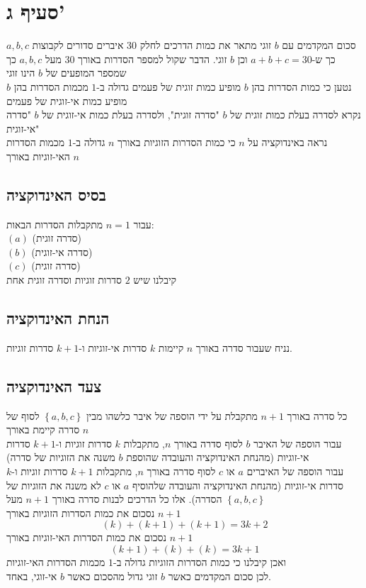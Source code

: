 \documentclass[12pt, titlepage]{article}
\begin{document}
\section*{סעיף ג'}
סכום המקדמים עם $b$ זוגי מתאר את כמות הדרכים לחלק $30$ איברים סדורים לקבוצות $a,b,c$ כך ש-$a+b+c=30$ וכן $b$ זוגי. הדבר שקול למספר הסדרות באורך $30$ מעל $a,b,c$ כך שמספר המופעים של $b$ הינו זוגי\\
נטען כי כמות הסדרות בהן $b$ מופיע כמות זוגית של פעמים גדולה ב-$1$ מכמות הסדרות בהן $b$ מופיע כמות אי-זוגית של פעמים\\
נקרא לסדרה בעלת כמות זוגית של $b$ "סדרה זוגית", ולסדרה בעלת כמות אי-זוגית של $b$ "סדרה אי-זוגית" \\
נראה באינדוקציה על $n$ כי כמות הסדרות הזוגיות באורך $n$ גדולה ב-$1$ מכמות הסדרות האי-זוגיות באורך $n$
\subsection*{בסיס האינדוקציה}
עבור $n=1$ מתקבלות הסדרות הבאות:\\
$\left(a\right)$ (סדרה זוגית) \\
$\left(b\right)$ (סדרה אי-זוגית) \\
$\left(c\right)$ (סדרה זוגית) \\
קיבלנו שיש $2$ סדרות זוגיות וסדרה זוגית אחת
\subsection*{הנחת האינדוקציה}
נניח שעבור סדרה באורך $n$ קיימות $k$ סדרות אי-זוגיות ו-$k+1$ סדרות זוגיות.
\subsection*{צעד האינדוקציה}
כל סדרה באורך $n+1$ מתקבלת על ידי הוספה של איבר כלשהו מבין $\left\{a,b,c\right\}$ לסוף של סדרה קיימת באורך $n$\\
עבור הוספה של האיבר $b$ לסוף סדרה באורך $n$, מתקבלות $k$ סדרות זוגיות ו-$k+1$ סדרות אי-זוגיות (מהנחת האינדוקציה והעובדה שהוספת $b$ משנה את הזוגיות של סדרה)\\
עבור הוספה של האיברים $a$ או $c$ לסוף סדרה באורך $n$, מתקבלות $k+1$ סדרות זוגיות ו-$k$ סדרות אי-זוגיות (מהנחת האינדוקציה והעובדה שלהוסיף $a$ או $c$ לא משנה את הזוגיות של הסדרה). אלו כל הדרכים לבנות סדרה באורך $n+1$ מעל $\left\{a,b,c\right\}$\\
נסכום את כמות הסדרות הזוגיות באורך $n+1$
\[
    \left(k\right) + \left(k+1\right) + \left(k+1\right) = 3k+2
\]
נסכום את כמות הסדרות האי-זוגיות באורך $n+1$
\[
    \left(k+1\right) + \left(k\right) + \left(k\right) = 3k+1
\]
ואכן קיבלנו כי כמות הסדרות הזוגיות גדולה ב-$1$ מכמות הסדרות האי-זוגיות\\
לכן סכום המקדמים כאשר $b$ זוגי גדול מהסכום כאשר $b$ אי-זוגי, באחד.
\end{document}
